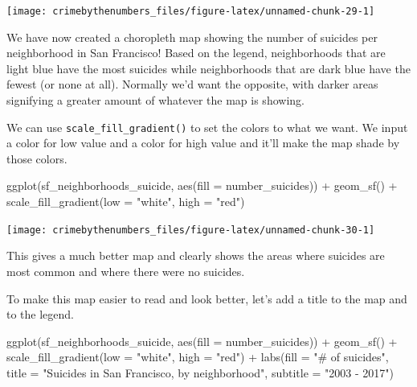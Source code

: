 \documentclass[
]{krantz}
\makeatletter
\newenvironment{Shaded}{\begin{snugshade}}{\end{snugshade}}
\newcommand{\AttributeTok}[1]{\textcolor[rgb]{0.61,0.61,0.61}{#1}}
\newcommand{\FunctionTok}[1]{\textcolor[rgb]{0,0,0}{#1}}
\newcommand{\NormalTok}[1]{#1}
\newcommand{\SpecialCharTok}[1]{\textcolor[rgb]{0,0,0}{#1}}
\newcommand{\StringTok}[1]{\textcolor[rgb]{0.5,0.5,0.5}{#1}}
\newenvironment{kframe}{%
\medskip{}
\setlength{\fboxsep}{.8em}
 \def\at@end@of@kframe{}%
 \ifinner\ifhmode%
  \def\at@end@of@kframe{\end{minipage}}%
  \begin{minipage}{\columnwidth}%
 \fi\fi%
 \def\FrameCommand##1{\hskip\@totalleftmargin \hskip-\fboxsep
 \colorbox{shadecolor}{##1}\hskip-\fboxsep
     \hskip-\linewidth \hskip-\@totalleftmargin \hskip\columnwidth}%
 \MakeFramed {\advance\hsize-\width
   \@totalleftmargin\z@ \linewidth\hsize
   \@setminipage}}%
 {\par\unskip\endMakeFramed%
 \at@end@of@kframe}
\renewenvironment{Shaded}{\begin{kframe}}{\end{kframe}}
\makeatother
\begin{document}
\begin{center}\texttt{[image: crimebythenumbers\_files/figure-latex/unnamed-chunk-29-1]} \end{center}

We have now created a choropleth map showing the number of suicides per neighborhood in San Francisco! Based on the legend, neighborhoods that are light blue have the most suicides while neighborhoods that are dark blue have the fewest (or none at all). Normally we'd want the opposite, with darker areas signifying a greater amount of whatever the map is showing.

We can use \texttt{scale\_fill\_gradient()} to set the colors to what we want. We input a color for low value and a color for high value and it'll make the map shade by those colors.

\begin{Shaded}
\begin{Highlighting}[]
\FunctionTok{ggplot}\NormalTok{(sf\_neighborhoods\_suicide, }\FunctionTok{aes}\NormalTok{(}\AttributeTok{fill =}\NormalTok{ number\_suicides)) }\SpecialCharTok{+}
  \FunctionTok{geom\_sf}\NormalTok{() }\SpecialCharTok{+} \FunctionTok{scale\_fill\_gradient}\NormalTok{(}\AttributeTok{low =} \StringTok{"white"}\NormalTok{, }\AttributeTok{high =} \StringTok{"red"}\NormalTok{)}
\end{Highlighting}
\end{Shaded}

\begin{center}\texttt{[image: crimebythenumbers\_files/figure-latex/unnamed-chunk-30-1]} \end{center}

This gives a much better map and clearly shows the areas where suicides are most common and where there were no suicides.

To make this map easier to read and look better, let's add a title to the map and to the legend.

\begin{Shaded}
\begin{Highlighting}[]
\FunctionTok{ggplot}\NormalTok{(sf\_neighborhoods\_suicide, }\FunctionTok{aes}\NormalTok{(}\AttributeTok{fill =}\NormalTok{ number\_suicides)) }\SpecialCharTok{+}
  \FunctionTok{geom\_sf}\NormalTok{() }\SpecialCharTok{+} \FunctionTok{scale\_fill\_gradient}\NormalTok{(}\AttributeTok{low =} \StringTok{"white"}\NormalTok{, }\AttributeTok{high =} \StringTok{"red"}\NormalTok{) }\SpecialCharTok{+}
  \FunctionTok{labs}\NormalTok{(}\AttributeTok{fill =} \StringTok{"\# of suicides"}\NormalTok{, }\AttributeTok{title =} \StringTok{"Suicides in San Francisco, by neighborhood"}\NormalTok{,}
    \AttributeTok{subtitle =} \StringTok{"2003 {-} 2017"}\NormalTok{)}
\end{Highlighting}
\end{Shaded}
\end{document}

